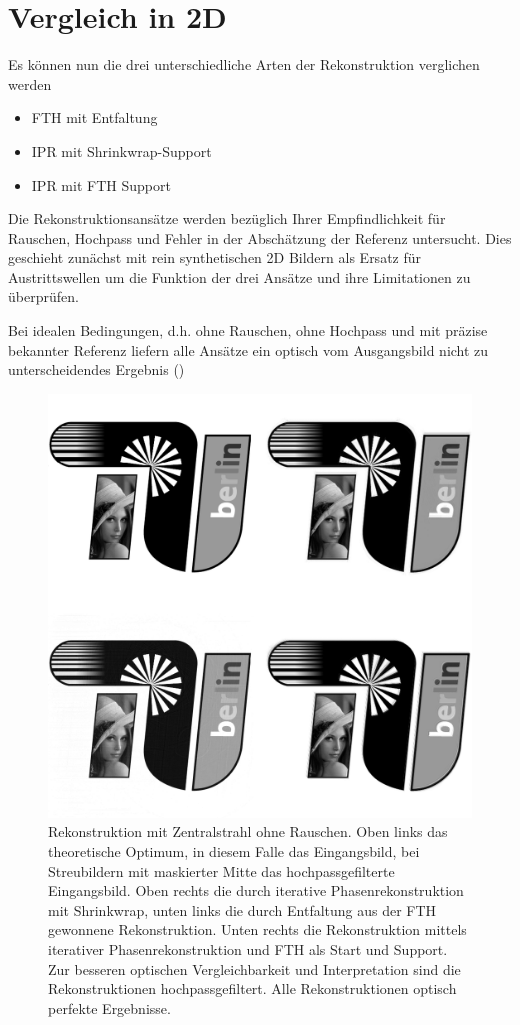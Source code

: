 \section{Vergleich in 2D}	
Es können nun die drei unterschiedliche Arten der Rekonstruktion verglichen werden
\begin{itemize}
	\item FTH mit Entfaltung
	\item IPR mit Shrinkwrap-Support
	\item IPR mit FTH Support
\end{itemize}

Die Rekonstruktionsansätze werden bezüglich Ihrer Empfindlichkeit für Rauschen, Hochpass und Fehler in der Abschätzung der Referenz untersucht. Dies geschieht zunächst mit rein synthetischen 2D Bildern als Ersatz für Austrittswellen um die Funktion der drei Ansätze und ihre Limitationen zu überprüfen.

Bei idealen Bedingungen, d.h. ohne Rauschen, ohne Hochpass und mit präzise bekannter Referenz liefern alle Ansätze ein optisch vom Ausgangsbild nicht zu unterscheidendes Ergebnis ()

\begin{figure}
	\includegraphics[width=.48\textwidth]{images/recon2d-perfect.png}
	\caption[2D Rekonstruktion: Ideal]{Rekonstruktion mit Zentralstrahl ohne Rauschen. Oben links das theoretische Optimum, in diesem Falle das Eingangsbild, bei Streubildern mit maskierter Mitte das hochpassgefilterte Eingangsbild. Oben rechts die durch iterative Phasenrekonstruktion mit Shrinkwrap, unten links die durch Entfaltung  aus der FTH gewonnene Rekonstruktion. Unten rechts die Rekonstruktion mittels iterativer Phasenrekonstruktion und FTH als Start und Support. Zur besseren optischen Vergleichbarkeit und Interpretation sind die Rekonstruktionen hochpassgefiltert. Alle Rekonstruktionen optisch perfekte Ergebnisse.}
	\label{fig:recon2d-perfect}
\end{figure}

